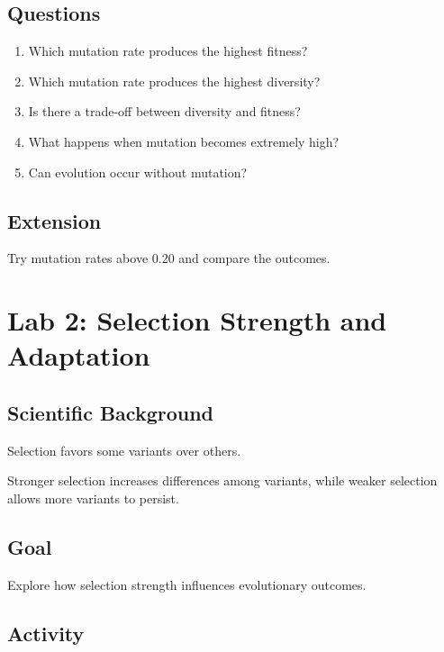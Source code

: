 \documentclass[
  oneside,
  openany]{book}
\providecommand{\tightlist}{%
  \setlength{\itemsep}{0pt}\setlength{\parskip}{0pt}}
\begin{document}
\subsection{Questions}\label{questions}

\begin{enumerate}
\def\labelenumi{\arabic{enumi}.}
\tightlist
\item
  Which mutation rate produces the highest fitness?
\item
  Which mutation rate produces the highest diversity?
\item
  Is there a trade-off between diversity and fitness?
\item
  What happens when mutation becomes extremely high?
\item
  Can evolution occur without mutation?
\end{enumerate}

\subsection{Extension}\label{extension}

Try mutation rates above 0.20 and compare the outcomes.

\section{Lab 2: Selection Strength and Adaptation}\label{lab-2-selection-strength-and-adaptation}

\subsection{Scientific Background}\label{scientific-background-1}

Selection favors some variants over others.

Stronger selection increases differences among variants, while weaker selection allows more variants to persist.

\subsection{Goal}\label{goal-1}

Explore how selection strength influences evolutionary outcomes.

\subsection{Activity}\label{activity-1}
\end{document}
